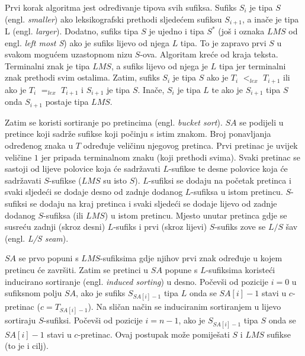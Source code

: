 \documentclass[times, utf8, proizvoljni, numeric]{fer}
\begin{document}
Prvi korak algoritma jest određivanje tipova svih sufiksa. Sufiks $S_{i}$ je tipa $S$ (engl. \textit{smaller}) ako leksikografski prethodi sljedećem sufiksu $S_{i+1}$, a inače je tipa L (engl. \textit{larger}). Dodatno, sufiks tipa $S$ je ujedno i tipa $S^*$ (još i oznaka $LMS$ od engl. \textit{left most S}) ako je sufiks lijevo od njega $L$ tipa. To je zapravo prvi $S$ u svakom mogućem uzastopnom nizu $S$-ova. Algoritam kreće od kraja teksta. Terminalni znak je tipa $LMS$, a sufiks lijevo od njega je $L$ tipa jer terminalni znak prethodi svim ostalima. Zatim, sufiks $S_{i}$ je tipa $S$ ako je $T_{i}$ $<_{lex}$ $T_{i+1}$ ili ako je $T_{i}$ $=_{lex}$ $T_{i+1}$ i $S_{i+1}$ je tipa $S$. Inače, $S_{i}$ je tipa $L$ te ako je $S_{i+1}$ tipa $S$ onda $S_{i+1}$ postaje tipa $LMS$.

Zatim se koristi sortiranje po pretincima (engl. \textit{bucket sort}). $SA$ se podijeli u pretince koji sadrže sufikse koji počinju s istim znakom. Broj ponavljanja određenog znaka u $T$ određuje veličinu njegovog pretinca. Prvi pretinac je uvijek veličine $1$ jer pripada terminalnom znaku (koji prethodi svima). Svaki pretinac se sastoji od lijeve polovice koja će sadržavati $L$-sufikse te desne polovice koja će sadržavati $S$-sufikse ($LMS$ su isto $S$). $L$-sufiksi se dodaju na početak pretinca i svaki sljedeći se dodaje desno od zadnje dodanog $L$-sufiksa u istom pretincu. $S$-sufiksi se dodaju na kraj pretinca i svaki sljedeći se dodaje lijevo od zadnje dodanog $S$-sufiksa (ili $LMS$) u istom pretincu. Mjesto unutar pretinca gdje se susreću zadnji (skroz desni) $L$-sufiks i prvi (skroz lijevi) $S$-sufiks zove se $L/S$ šav (engl. \textit{L/S seam}).

$SA$ se prvo popuni s $LMS$-sufiksima gdje njihov prvi znak određuje u kojem pretincu će završiti. Zatim se pretinci u $SA$ popune s $L$-sufiksima koristeći inducirano sortiranje (engl. \textit{induced sorting}) u desno. Počevši od pozicije $i=0$ u sufiksnom polju $SA$, ako je sufiks $S_{SA[i]-1}$ tipa $L$ onda se $SA[i]-1$ stavi u $c$-pretinac ($c=T_{SA[i]-1}$). Na sličan način se induciranim sortiranjem u lijevo sortiraju $S$-sufiksi. Počevši od pozicije $i=n-1$, ako je $S_{SA[i]-1}$ tipa $S$ onda se $SA[i]-1$ stavi u $c$-pretinac. Ovaj postupak može pomiješati $S$ i $LMS$ sufikse (to je i cilj).
\end{document}
